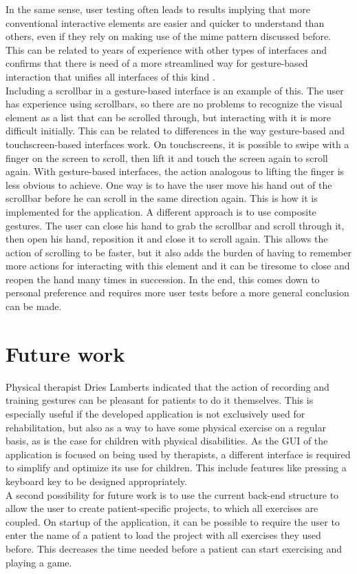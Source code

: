In the same sense, user testing often leads to results implying that more conventional interactive elements are easier and quicker to understand than others, even if they rely on making use of the mime pattern discussed before. This can be related to years of experience with other types of interfaces and confirms that there is need of a more streamlined way for gesture-based interaction that unifies all interfaces of this kind \cite{Norman2010}.\\

Including a scrollbar in a gesture-based interface is an example of this. The user has experience using scrollbars, so there are no problems to recognize the visual element as a list that can be scrolled through, but interacting with it is more difficult initially. This can be related to differences in the way gesture-based and touchscreen-based interfaces work. On touchscreens, it is possible to swipe with a finger on the screen to scroll, then lift it and touch the screen again to scroll again. With gesture-based interfaces, the action analogous to lifting the finger is less obvious to achieve. One way is to have the user move his hand out of the scrollbar before he can scroll in the same direction again. This is how it is implemented for the application. A different approach is to use composite gestures. The user can close his hand to grab the scrollbar and scroll through it, then open his hand, reposition it and close it to scroll again. This allows the action of scrolling to be faster, but it also adds the burden of having to remember more actions for interacting with this element and it can be tiresome to close and reopen the hand many times in succession. In the end, this comes down to personal preference and requires more user tests before a more general conclusion can be made.\\


\section{Future work}

Physical therapist Dries Lamberts indicated that the action of recording and training gestures can be pleasant for patients to do it themselves. This is especially useful if the developed application is not exclusively used for rehabilitation, but also as a way to have some physical exercise on a regular basis, as is the case for children with physical disabilities. As the GUI of the application is focused on being used by therapists, a different interface is required to simplify and optimize its use for children. This include features like pressing a keyboard key to be designed appropriately.\\

A second possibility for future work is to use the current back-end structure to allow the user to create patient-specific projects, to which all exercises are coupled. On startup of the application, it can be possible to require the user to enter the name of a patient to load the project with all exercises they used before. This decreases the time needed before a patient can start exercising and playing a game.
